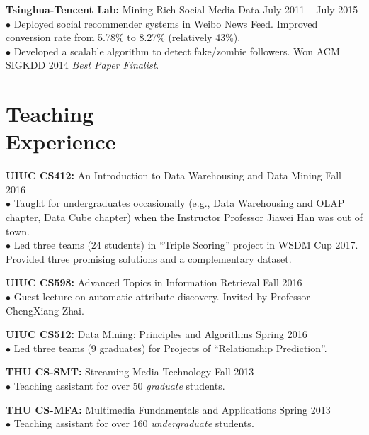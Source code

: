 \documentclass[margin, 10pt]{res}
\begin{document}
\begin{resume}
{\textbf{Tsinghua-Tencent Lab:} Mining Rich Social Media Data} \hfill{July 2011 -- July 2015} \\
$\bullet$ Deployed social recommender systems in Weibo News Feed. Improved conversion rate from 5.78\% to 8.27\% (relatively 43\%). \\
$\bullet$ Developed a scalable algorithm to detect fake/zombie followers. Won ACM SIGKDD 2014 \textit{Best Paper Finalist}.


\section{Teaching \\ Experience}

{\textbf{UIUC CS412:} An Introduction to Data Warehousing and Data Mining} \hfill{Fall 2016} \\
$\bullet$ Taught for undergraduates occasionally (e.g., Data Warehousing and OLAP chapter, Data Cube chapter) when the Instructor Professor Jiawei Han was out of town. \\
$\bullet$ Led three teams (24 students) in ``Triple Scoring'' project in WSDM Cup 2017. Provided three promising solutions and a complementary dataset.

{\textbf{UIUC CS598:} Advanced Topics in Information Retrieval} \hfill{Fall 2016} \\
$\bullet$ Guest lecture on automatic attribute discovery. Invited by Professor ChengXiang Zhai.

{\textbf{UIUC CS512:} Data Mining: Principles and Algorithms} \hfill{Spring 2016} \\
$\bullet$ Led three teams (9 graduates) for Projects of ``Relationship Prediction''.

{\textbf{THU CS-SMT:} Streaming Media Technology} \hfill{Fall 2013} \\
$\bullet$ Teaching assistant for over 50 \textit{graduate} students.

{\textbf{THU CS-MFA:} Multimedia Fundamentals and Applications} \hfill{Spring 2013} \\
$\bullet$ Teaching assistant for over 160 \textit{undergraduate} students.



\end{resume}
\end{document}
